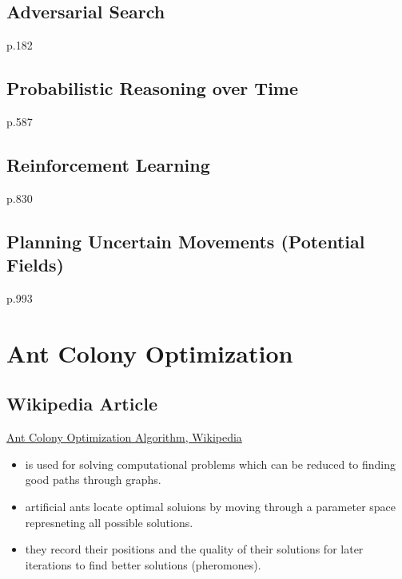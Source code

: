 \subsection{Adversarial Search}
p.182

\subsection{Probabilistic Reasoning over Time}
p.587

\subsection{Reinforcement Learning}
p.830

\subsection{Planning Uncertain Movements (Potential Fields)}
p.993

\section{Ant Colony Optimization}
\subsection{Wikipedia Article}
\href{https://en.wikipedia.org/wiki/Ant_colony_optimization_algorithms}{Ant Colony Optimization Algorithm, Wikipedia}
\begin{itemize}[noitemsep,nolistsep]
	\item is used for solving computational problems which can be reduced to finding good paths through graphs.
	\item artificial ants locate optimal soluions by moving through a parameter space represneting all possible solutions.
	\item they record their positions and the quality of their solutions for later iterations to find better solutions (pheromones).
\end{itemize}

